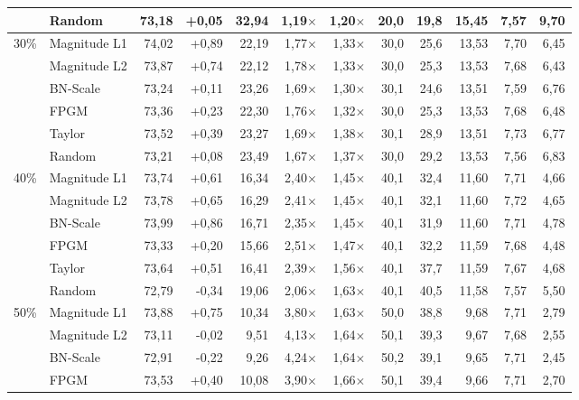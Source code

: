 \begin{table}[H]
{{\begin{tabular}{c l rr rrr rr rrr}
     & Random & 73,18 & +0,05 & 32,94 & 1,19$\times$ & 1,20$\times$ & 20,0 & 19,8 & 15,45 & 7,57 & 9,70 \\
    \midrule
    \multirow{6}{*}{30\%} & Magnitude L1 & 74,02 & +0,89 & 22,19 & 1,77$\times$ & 1,33$\times$ & 30,0 & 25,6 & 13,53 & 7,70 & 6,45 \\
     & Magnitude L2 & 73,87 & +0,74 & 22,12 & 1,78$\times$ & 1,33$\times$ & 30,0 & 25,3 & 13,53 & 7,68 & 6,43 \\
     & BN-Scale & 73,24 & +0,11 & 23,26 & 1,69$\times$ & 1,30$\times$ & 30,1 & 24,6 & 13,51 & 7,59 & 6,76 \\
     & FPGM & 73,36 & +0,23 & 22,30 & 1,76$\times$ & 1,32$\times$ & 30,0 & 25,3 & 13,53 & 7,68 & 6,48 \\
     & Taylor & 73,52 & +0,39 & 23,27 & 1,69$\times$ & 1,38$\times$ & 30,1 & 28,9 & 13,51 & 7,73 & 6,77 \\
     & Random & 73,21 & +0,08 & 23,49 & 1,67$\times$ & 1,37$\times$ & 30,0 & 29,2 & 13,53 & 7,56 & 6,83 \\
    \midrule
    \multirow{6}{*}{40\%} & Magnitude L1 & 73,74 & +0,61 & 16,34 & 2,40$\times$ & 1,45$\times$ & 40,1 & 32,4 & 11,60 & 7,71 & 4,66 \\
     & Magnitude L2 & 73,78 & +0,65 & 16,29 & 2,41$\times$ & 1,45$\times$ & 40,1 & 32,1 & 11,60 & 7,72 & 4,65 \\
     & BN-Scale & 73,99 & +0,86 & 16,71 & 2,35$\times$ & 1,45$\times$ & 40,1 & 31,9 & 11,60 & 7,71 & 4,78 \\
     & FPGM & 73,33 & +0,20 & 15,66 & 2,51$\times$ & 1,47$\times$ & 40,1 & 32,2 & 11,59 & 7,68 & 4,48 \\
     & Taylor & 73,64 & +0,51 & 16,41 & 2,39$\times$ & 1,56$\times$ & 40,1 & 37,7 & 11,59 & 7,67 & 4,68 \\
     & Random & 72,79 & -0,34 & 19,06 & 2,06$\times$ & 1,63$\times$ & 40,1 & 40,5 & 11,58 & 7,57 & 5,50 \\
    \midrule
    \multirow{6}{*}{50\%} & Magnitude L1 & 73,88 & +0,75 & 10,34 & 3,80$\times$ & 1,63$\times$ & 50,0 & 38,8 & 9,68 & 7,71 & 2,79 \\
     & Magnitude L2 & 73,11 & -0,02 & 9,51 & 4,13$\times$ & 1,64$\times$ & 50,1 & 39,3 & 9,67 & 7,68 & 2,55 \\
     & BN-Scale & 72,91 & -0,22 & 9,26 & 4,24$\times$ & 1,64$\times$ & 50,2 & 39,1 & 9,65 & 7,71 & 2,45 \\
     & FPGM & 73,53 & +0,40 & 10,08 & 3,90$\times$ & 1,66$\times$ & 50,1 & 39,4 & 9,66 & 7,71 & 2,70 \\

\end{tabular}}}
\end{table}
